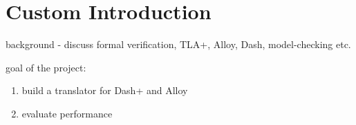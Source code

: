 \chapter{Custom Introduction}


background - discuss formal verification, TLA+, Alloy, Dash, model-checking etc.

goal of the project:

\begin{enumerate}
	\item build a translator for Dash+ and Alloy
	\item evaluate performance
\end{enumerate}